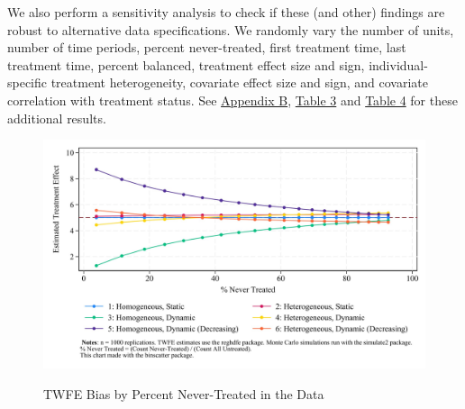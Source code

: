 \documentclass[12pt]{article}
\begin{document}
We also perform a sensitivity analysis to check if these (and other) findings are robust to alternative data specifications. We randomly vary the number of units, number of time periods, percent never-treated, first treatment time, last treatment time, percent balanced, treatment effect size and sign, individual-specific treatment heterogeneity, covariate effect size and sign, and covariate correlation with treatment status. See \hyperref[sec:appendixb]{Appendix B}, \hyperref[tab:sensitivity-table]{Table 3} and \hyperref[tab:sensitivity-table-interact]{Table 4} for these additional results.
\begin{figure}[H]
    \centering
    \caption{TWFE Bias by Percent Never-Treated in the Data}
    \includegraphics[width=6in]{Figures/TWFE Bias by Percent Never Treated.jpg}
    \label{fig:pc-nevertreat}
\end{figure}
\end{document}
